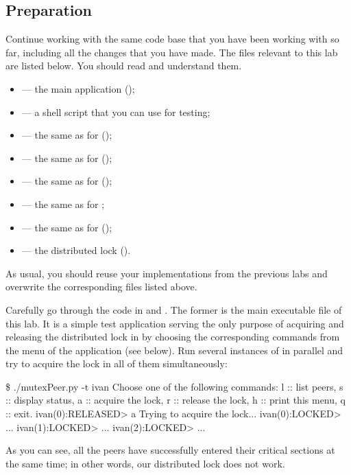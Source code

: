 \documentclass[a4paper]{article}
\begin{document}
\subsection{Preparation}
Continue working with the same code base that you have been working with so far,
including all the changes that you have made. The files relevant to this lab are
listed below. You should read and understand them.
\begin{itemize}

  \item {} --- the main application (\leave);

  \item {} --- a shell script that you can use for testing;

  \item {} --- the same as for
   (\leave);

  \item {} --- the same as for 
  (\overwrite);

  \item {} --- the same as for 
  (\overwrite);

  \item {} --- the same as for ;

  \item {} --- the same as for 
  (\overwrite);

  \item {} --- the distributed
  lock (\fix).

\end{itemize}
As usual, you should reuse your implementations from the previous labs and
overwrite the corresponding files listed above.

Carefully go through the code in  and
. The former is the main executable file of this
lab. It is a simple test application serving the only purpose of acquiring and
releasing the distributed lock in  by choosing the
corresponding commands from the menu of the application (see below). Run several
instances of  in parallel and try to acquire the lock in
all of them simultaneously:
\begin{shell}
\$ ./mutexPeer.py -t ivan
Choose one of the following commands:
    l  ::  list peers,
    s  ::  display status,
    a  ::  acquire the lock,
    r  ::  release the lock,
    h  ::  print this menu,
    q  ::  exit.
ivan(0):RELEASED> a
Trying to acquire the lock...
ivan(0):LOCKED>
...
ivan(1):LOCKED>
...
ivan(2):LOCKED>
...
\end{shell}
As you can see, all the peers have successfully entered their critical sections
at the same time; in other words, our distributed lock does not work.
\end{document}
